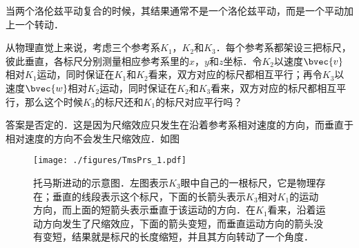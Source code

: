

当两个洛伦兹平动复合的时候，其结果通常不是一个洛伦兹平动，而是一个平动加上一个转动．

从物理直觉上来说，考虑三个参考系$K_1$，$K_2$和$K_3$．每个参考系都架设三把标尺，彼此垂直，各标尺分别测量相应参考系里的$x$，$y$和$z$坐标．令$K_2$以速度$\bvec{v}$相对$K_1$运动，同时保证在$K_1$和$K_2$看来，双方对应的标尺都相互平行；再令$K_3$以速度$\bvec{w}$相对$K_2$运动，同时保证在$K_2$和$K_3$看来，双方对应的标尺都相互平行，那么这个时候$K_3$的标尺还和$K_1$的标尺对应平行吗？

答案是否定的．这是因为尺缩效应只发生在沿着参考系相对速度的方向，而垂直于相对速度的方向不会发生尺缩效应．如图

\begin{figure}[ht]
\centering
\texttt{[image: ./figures/TmsPrs\_1.pdf]}
\caption{托马斯进动的示意图．左图表示$K_3$眼中自己的一根标尺，它是物理存在；垂直的线段表示这个标尺，下面的长箭头表示$K_3$相对$K_1$的运动方向，而上面的短箭头表示垂直于该运动的方向．在$K_1$看来，沿着运动方向发生了尺缩效应，下面的箭头变短，而垂直运动方向的箭头没有变短，结果就是标尺的长度缩短，并且其方向转动了一个角度．} \label{TmsPrs_fig1}
\end{figure}



